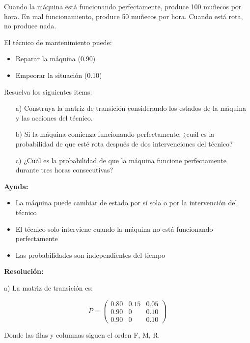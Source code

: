 \documentclass[a4paper,11pt]{article}
\begin{document}
Cuando la máquina está funcionando perfectamente, produce 100 muñecos por hora. En mal funcionamiento, produce 50 muñecos por hora. Cuando está rota, no produce nada.

\vspace{0.5em}

El técnico de mantenimiento puede:
\begin{itemize}
    \item Reparar la máquina (0.90)
    \item Empeorar la situación (0.10)
\end{itemize}

Resuelva los siguientes items:

\begin{itemize}
    \item[a)] Construya la matriz de transición considerando los estados de la máquina y las acciones del técnico.
    \item[b)] Si la máquina comienza funcionando perfectamente, ¿cuál es la probabilidad de que esté rota después de dos intervenciones del técnico?
    \item[c)] ¿Cuál es la probabilidad de que la máquina funcione perfectamente durante tres horas consecutivas?
\end{itemize}

\textbf{Ayuda:}
\begin{itemize}
    \item La máquina puede cambiar de estado por sí sola o por la intervención del técnico
    \item El técnico solo interviene cuando la máquina no está funcionando perfectamente
    \item Las probabilidades son independientes del tiempo
\end{itemize}

\textbf{Resolución:}

\vspace{0.5em}

a) La matriz de transición es:

\[P = \begin{pmatrix}
0.80 & 0.15 & 0.05 \\
0.90 & 0 & 0.10 \\
0.90 & 0 & 0.10
\end{pmatrix}\]

\begin{center}
    Donde las filas y columnas siguen el orden F, M, R.
\end{center}
\end{document}
